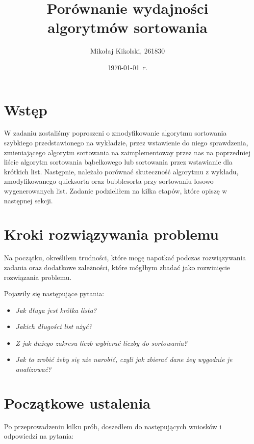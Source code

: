 \documentclass[12pt,a4paper]{article}
\begin{document}
\title{Porównanie wydajności algorytmów sortowania}

\author{Mikołaj Kikolski, 261830}

\date{\today~r.}

\maketitle

\section{Wstęp}
W zadaniu zostaliśmy poproszeni o zmodyfikowanie algorytmu sortowania szybkiego przedstawionego na wykładzie, przez wstawienie do niego sprawdzenia, zmieniającego algorytm sortowania na zaimplementoway przez nas na poprzedniej liście algorytm sortowania bąbelkowego lub sortowania przez wstawianie dla krótkich list. Następnie, należało porównać skuteczność algorytmu z wykładu, zmodyfikowanego quicksorta oraz bubblesorta przy sortowaniu losowo wygenerowanych list. Zadanie podzieliłem na kilka etapów, które opiszę w następnej sekcji.
\section{Kroki rozwiązywania problemu}
Na początku, określiłem trudności, które mogę napotkać podczas rozwiązywania zadania oraz dodatkowe zależności, które mógłbym zbadać jako rozwinięcie rozwiązania problemu.\par
Pojawiły się następujące pytania:
\begin{itemize}
\item \textit{Jak długa jest krótka lista?}
\item \textit{Jakich długości list użyć?}
\item \textit{Z jak dużego zakresu liczb wybierać liczby do sortowania?}
\item \textit{Jak to zrobić żeby się nie narobić, czyli jak zbierać dane żey wygodnie je analizować?}
\end{itemize}
\section{Początkowe ustalenia}
Po przeprowadzeniu kilku prób, doszedłem do następujących wniosków i odpowiedzi na pytania:
\end{document}
